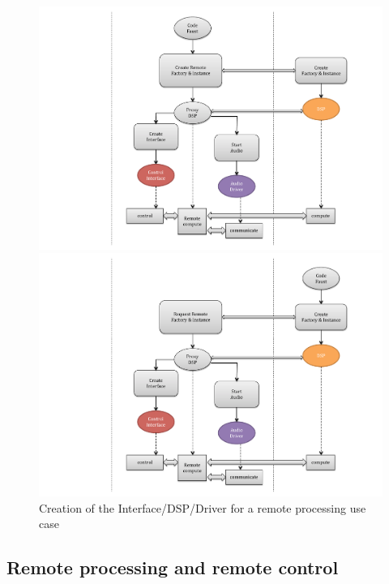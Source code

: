 \documentclass[a4paper]{article}
\begin{document}
\begin{figure}[!h]
\begin{center}

\begin{minipage}[c]{.45\linewidth}
\includegraphics[width=\columnwidth]{images/CCC41}
\end{minipage}
\begin{minipage}[r]{.45\linewidth}
\includegraphics[width=\columnwidth]{images/CCC42}
\end{minipage}
\caption{Creation of the Interface/DSP/Driver for a remote processing use case}
\label{fig:CCC4}
\end{center}
\end{figure}

\newpage
\subsection{ Remote processing and remote control}
\end{document}
